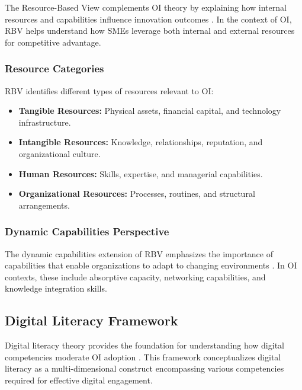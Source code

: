 The Resource-Based View complements OI theory by explaining how internal resources and capabilities influence innovation outcomes \citep{barney1991firm}. In the context of OI, RBV helps understand how SMEs leverage both internal and external resources for competitive advantage.

\subsubsection{Resource Categories}
RBV identifies different types of resources relevant to OI:
\begin{itemize}
    \item \textbf{Tangible Resources:} Physical assets, financial capital, and technology infrastructure.
    \item \textbf{Intangible Resources:} Knowledge, relationships, reputation, and organizational culture.
    \item \textbf{Human Resources:} Skills, expertise, and managerial capabilities.
    \item \textbf{Organizational Resources:} Processes, routines, and structural arrangements.
\end{itemize}

\subsubsection{Dynamic Capabilities Perspective}
The dynamic capabilities extension of RBV emphasizes the importance of capabilities that enable organizations to adapt to changing environments \citep{teece1997dynamic}. In OI contexts, these include absorptive capacity, networking capabilities, and knowledge integration skills.

\subsection{Digital Literacy Framework}

Digital literacy theory provides the foundation for understanding how digital competencies moderate OI adoption \citep{eshet2004digital}. This framework conceptualizes digital literacy as a multi-dimensional construct encompassing various competencies required for effective digital engagement.

